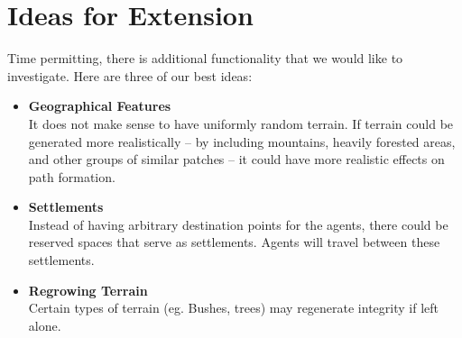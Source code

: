 \documentclass[10pt,runningheads]{llncs}
\begin{document}
\section{Ideas for Extension}
Time permitting, there is additional functionality that we would like to investigate. Here are three of our best ideas:

\begin{itemize}  

    \item \textbf{Geographical Features} \\
        It does not make sense to have uniformly random terrain. If terrain could be generated more realistically -- by including mountains, heavily forested areas, and other groups of similar patches -- it could have more realistic effects on path formation.
    \item \textbf{Settlements} \\
        Instead of having arbitrary destination points for the agents, there could be reserved spaces that serve as settlements. Agents will travel between these settlements. 
    \item \textbf{Regrowing Terrain} \\
        Certain types of terrain (eg. Bushes, trees) may regenerate integrity if left alone.
\end{itemize}

\end{document}
